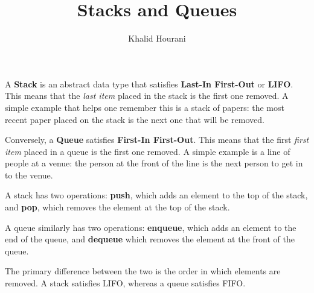 \documentclass[a4paper]{article}
\title{Stacks and Queues}
\author{Khalid Hourani}
\begin{document}
\maketitle

A \textbf{Stack} is an abstract data type that satisfies \textbf{Last-In First-Out} or \textbf{LIFO}. This means that the \textit{last item} placed in the stack is the first one removed. A simple example that helps one remember this is a stack of papers: the most recent paper placed on the stack is the next one that will be removed. 

Conversely, a \textbf{Queue} satisfies \textbf{First-In First-Out}. This means that the first \textit{first item} placed in a queue is the first one removed. A simple example is a line of people at a venue: the person at the front of the line is the next person to get in to the venue. 

A stack has two operations: \textbf{push}, which adds an element to the top of the stack, and \textbf{pop}, which removes the element at the top of the stack.

A queue similarly has two operations: \textbf{enqueue}, which adds an element to the end of the queue, and \textbf{dequeue} which removes the element at the front of the queue.

The primary difference between the two is the order in which elements are removed. A stack satisfies LIFO, whereas a queue satisfies FIFO.
\end{document}
